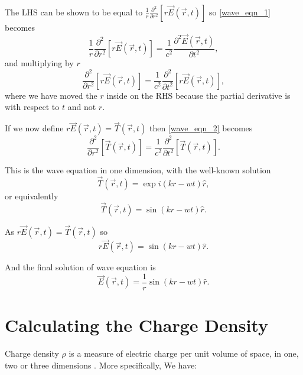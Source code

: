    The LHS can be shown to be equal to $\frac{1}{r}\frac{\partial^2}{\partial r^2}[r\vec{E}(\vec{r},t)]$ so \eqref{wave_eqn_1} becomes
%
   \begin{equation}
   \frac{1}{r}\frac{\partial^2}{\partial r^2}[r\vec{E}(\vec{r},t)] = \frac{1}{c^2}\frac{\partial^2\vec{E}(\vec{r},t)}{\partial t^2}, 
   \end{equation}
%
and multiplying by $r$
%
   \begin{equation}\label{wave_eqn_2}
   \frac{\partial^2}{\partial r^2}[r\vec{E}(\vec{r},t)] = \frac{1}{c^2}\frac{\partial^2}{\partial t^2}[r\vec{E}(\vec{r},t)],
   \end{equation}
%
where we have moved the $r$ inside on the RHS because the partial derivative is with respect to $t$ and not $r$.

If we now define $r\vec{E}(\vec{r},t) = \vec{T}(\vec{r},t)$ then \eqref{wave_eqn_2} becomes
%
   \begin{equation}
   \frac{\partial^2}{\partial r^2}[\vec{T}(\vec{r},t)] = \frac{1}{c^2}\frac{\partial^2}{\partial t^2}[\vec{T}(\vec{r},t)].
   \end{equation}

This is the wave equation in one dimension, with the well-known solution
%
\begin{equation}
\vec{T}(\vec{r},t) = \exp{i(kr-wt)}\hat{r},
\end{equation}
%
or equivalently
%
\begin{equation}
   \vec{T}(\vec{r},t) = \sin(kr-wt) \hat{r}.
\end{equation}

As $r \vec{E}(\vec{r},t) = \vec{T}(\vec{r},t)$ so
%
   \begin{equation}\label{eqn:radial_E}
      r\vec{E}(\vec{r},t) = \sin(kr-wt) \hat{r}.
   \end{equation}

And the final solution of wave equation is
%
\begin{equation}\label{eqn_E_final}
   \vec{E}(\vec{r},t) = \frac{1}{r}\sin(kr-wt) \hat{r}.
\end{equation}



\section{Calculating the Charge Density}

Charge density $\rho$ is a measure of electric charge per unit volume of space, in one, two or three dimensions \cite{wang1986electromagnetic}. More specifically, We have:

